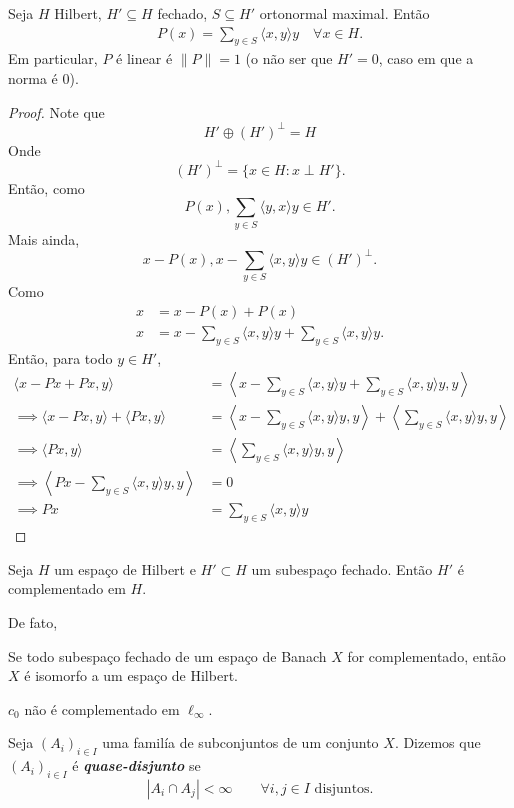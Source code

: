 \documentclass[portuguese]{article}
\theoremstyle{definition}
\begin{document}
\begin{prop}
	Seja $H$ Hilbert, $H'\subseteq H$ fechado, $S\subseteq H'$ ortonormal maximal. Então
	\begin{align*}
		P(x)=\sum_{y\in S}\langle x,y\rangle y\quad\forall x\in H.
	\end{align*}
	Em particular, $P$ é linear é $\|P\|=1$ (o não ser que $H'=0$, caso em que a norma é 0).
\end{prop}
\begin{proof}
	Note que
	\[H'\oplus(H')^\perp=H\]
	Onde
	\[(H')^\perp=\{x\in H:x\perp H'\}.\]
	Então, como
	\[P(x),\sum_{y\in S}\langle y,x\rangle y\in H'.\]
	Mais ainda,
	\[x-P(x),x-\sum_{y\in S}\langle x,y\rangle y\in(H')^\perp.\]
	Como
		\begin{align*}
			x&=x-P(x)+P(x)\\
			 x&= x-\sum_{y\in S}\langle x,y\rangle y+\sum_{y\in S}\langle x,y\rangle y.
		\end{align*}
		Então, para todo $y\in H'$,
		\begin{align*}
			\langle x-Px+Px,y\rangle&=\left\langle x-\sum_{y\in S}\langle x,y\rangle y+\sum_{y\in S}\langle x,y\rangle y,y\right\rangle\\
			\implies \langle x-Px,y\rangle+\langle Px,y\rangle&=\left\langle x-\sum_{y\in S}\langle x,y\rangle y,y\right\rangle+\left\langle\sum_{y\in S}\langle x,y\rangle y,y\right\rangle\\
			\implies \langle Px,y\rangle&=\left\langle \sum_{y\in S}\langle x,y\rangle y,y\right\rangle\\
			\implies \left\langle Px-\sum_{y\in S}\langle x,y\rangle y,y\right\rangle&=0\\
			\implies Px&=\sum_{y\in S}\langle x,y\rangle y
		\end{align*}
\end{proof}
\begin{coro}
	Seja $H$ um espaço de Hilbert e $H'\subset H$ um subespaço fechado. Então $H'$ é complementado em $H$.
\end{coro}
De fato,
\begin{teo}
	Se todo subespaço fechado de um espaço de Banach $X$ for complementado, então $X$ é isomorfo a um espaço de Hilbert.
\end{teo}
\begin{teo}
	$c_0$ não é complementado em $\ell_\infty$.
\end{teo}
\begin{defn}
	Seja $(A_i)_{i\in I}$ uma familía de subconjuntos de um conjunto $X$. Dizemos que $(A_i)_{i\in I}$ é \textbf{\textit{quase-disjunto}} se
	\[|A_i\cap A_j|<\infty\qquad\forall i,j\in I\text{ disjuntos.}\]
\end{defn}
\end{document}
